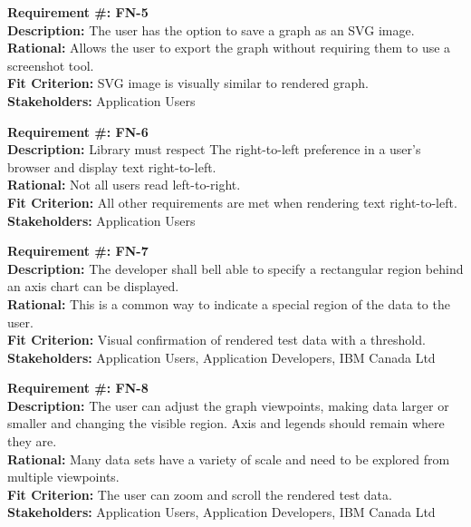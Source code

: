 \documentclass[12pt, titlepage]{article}
\begin{document}
\begin{flushleft}
\textbf{Requirement \#: FN-5} \\
\textbf{Description:} The user has the option to save a graph as an SVG image. \\
\textbf{Rational:} Allows the user to export the graph without requiring them to use a screenshot tool. \\
\textbf{Fit Criterion:} SVG image is visually similar to rendered graph. \\
\textbf{Stakeholders:} Application Users \\
\end{flushleft}
\begin{flushleft}
\textbf{Requirement \#: FN-6} \\
\textbf{Description:} Library must respect The right-to-left preference in a user's browser and display text right-to-left. \\
\textbf{Rational:} Not all users read left-to-right. \\
\textbf{Fit Criterion:} All other requirements are met when rendering text right-to-left. \\
\textbf{Stakeholders:} Application Users \\
\end{flushleft}
\begin{flushleft}
\textbf{Requirement \#: FN-7} \\
\textbf{Description:} The developer shall bell able to specify a rectangular region behind an axis chart can be displayed. \\
\textbf{Rational:} This is a common way to indicate a special region of the data to the user. \\
\textbf{Fit Criterion:} Visual confirmation of rendered test data with a threshold. \\
\textbf{Stakeholders:} Application Users, Application Developers, IBM Canada Ltd \\
\end{flushleft}
\begin{flushleft}
\textbf{Requirement \#: FN-8} \\
\textbf{Description:} The user can adjust the graph viewpoints, making data larger or smaller and changing the visible region. Axis and legends should remain where they are. \\
\textbf{Rational:} Many data sets have a variety of scale and need to be explored from multiple viewpoints. \\
\textbf{Fit Criterion:} The user can zoom and scroll the rendered test data. \\
\textbf{Stakeholders:} Application Users, Application Developers, IBM Canada Ltd \\
\end{flushleft}
\end{document}
